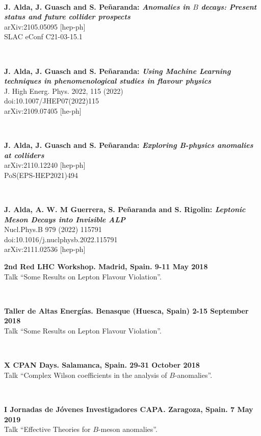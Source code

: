 \documentclass[combined.tex]{subfiles}
\begin{document}
~

\textbf{J. Alda, J. Guasch and S. Peñaranda: \textit{Anomalies in $B$ decays: Present status and future collider prospects}}\\
arXiv:2105.05095 [hep-ph]\\
SLAC eConf C21-03-15.1

~

\textbf{J. Alda, J. Guasch and S. Peñaranda: \textit{Using Machine Learning techniques in phenomenological studies in flavour physics}}\\
J. High Energ. Phys. 2022, 115 (2022)\\
doi:10.1007/JHEP07(2022)115\\
arXiv:2109.07405 [he-ph]

~

\textbf{J. Alda, J. Guasch and S. Peñaranda: \textit{Exploring B-physics anomalies at colliders}}\\
arXiv:2110.12240 [hep-ph]\\
PoS(EPS-HEP2021)494

~

\textbf{J. Alda, A. W. M Guerrera, S. Peñaranda and S. Rigolin: \textit{Leptonic Meson Decays into Invisible ALP}}\\
Nucl.Phys.B 979 (2022) 115791\\
doi:10.1016/j.nuclphysb.2022.115791\\
arXiv:2111.02536 [hep-ph]


\hspace{\parindent}\textbf{2nd Red LHC Workshop. Madrid, Spain. 9-11 May 2018}\\
Talk ``Some Results on Lepton Flavour Violation''.

~

\textbf{Taller de Altas Energías. Benasque (Huesca, Spain) 2-15 September 2018}\\
Talk ``Some Results on Lepton Flavour Violation''.

~

\textbf{X CPAN Days. Salamanca, Spain. 29-31 October 2018}\\
Talk ``Complex Wilson coefficients in the analysis of $B$-anomalies''.

~

\textbf{I Jornadas de Jóvenes Investigadores CAPA. Zaragoza, Spain. 7 May 2019}\\
Talk ``Effective Theories for $B$-meson anomalies''.
\end{document}
